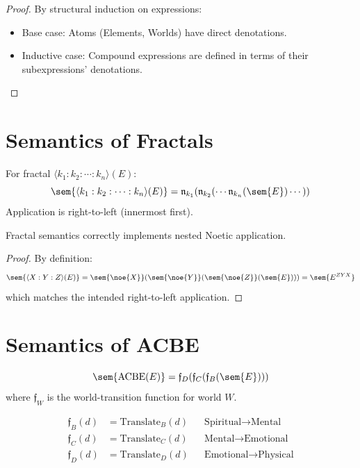 \begin{proof}
By structural induction on expressions:
\begin{itemize}
  \item Base case: Atoms (Elements, Worlds) have direct denotations.
  \item Inductive case: Compound expressions are defined in terms of their subexpressions' denotations.
\end{itemize}
\end{proof}

\section{Semantics of Fractals}

\begin{definition}
\label{def:fractal-sem}
For fractal $\langle k_1 : k_2 : \cdots : k_n \rangle(E)$:
\[
\sem{\langle k_1 : k_2 : \cdots : k_n \rangle(E)} = \mathfrak{n}_{k_1}(\mathfrak{n}_{k_2}(\cdots \mathfrak{n}_{k_n}(\sem{E})\cdots))
\]
Application is right-to-left (innermost first).
\end{definition}

\begin{theorem}
\label{thm:fractal-correct}
Fractal semantics correctly implements nested Noetic application.
\end{theorem}

\begin{proof}
By definition:
\[
\sem{\langle X : Y : Z \rangle(E)} = \sem{\noe{X}}(\sem{\noe{Y}}(\sem{\noe{Z}}(\sem{E}))) = \sem{E^{ZYX}}
\]
which matches the intended right-to-left application.
\end{proof}

\section{Semantics of ACBE}

\begin{definition}
\label{def:acbe-sem}
\[
\sem{\mathrm{ACBE}(E)} = \mathfrak{f}_D(\mathfrak{f}_C(\mathfrak{f}_B(\sem{E})))
\]
where $\mathfrak{f}_W$ is the world-transition function for world $W$.
\end{definition}

\begin{definition}
\label{def:world-trans}
\begin{align}
\mathfrak{f}_B(d) &= \mathrm{Translate}_B(d) && \text{Spiritual} \to \text{Mental} \\
\mathfrak{f}_C(d) &= \mathrm{Translate}_C(d) && \text{Mental} \to \text{Emotional} \\
\mathfrak{f}_D(d) &= \mathrm{Translate}_D(d) && \text{Emotional} \to \text{Physical}
\end{align}
\end{definition}

